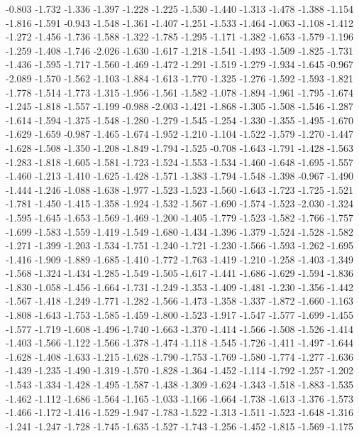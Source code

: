 \documentclass[9pt]{article}
\theoremstyle{plain}
\theoremstyle{definition}
\theoremstyle{remark}
\numberwithin{equation}{section}
\begin{document}
-0.803
-1.732
-1.336
-1.397
-1.228
-1.225
-1.530
-1.440
-1.313
-1.478
-1.388
-1.154
-1.816
-1.591
-0.943
-1.548
-1.361
-1.407
-1.251
-1.533
-1.464
-1.063
-1.108
-1.412
-1.272
-1.456
-1.736
-1.588
-1.322
-1.785
-1.295
-1.171
-1.382
-1.653
-1.579
-1.196
-1.259
-1.408
-1.746
-2.026
-1.630
-1.617
-1.218
-1.541
-1.493
-1.509
-1.825
-1.731
-1.436
-1.595
-1.717
-1.560
-1.469
-1.472
-1.291
-1.519
-1.279
-1.934
-1.645
-0.967
-2.089
-1.570
-1.562
-1.103
-1.884
-1.613
-1.770
-1.325
-1.276
-1.592
-1.593
-1.821
-1.778
-1.514
-1.773
-1.315
-1.956
-1.561
-1.582
-1.078
-1.894
-1.961
-1.795
-1.674
-1.245
-1.818
-1.557
-1.199
-0.988
-2.003
-1.421
-1.868
-1.305
-1.508
-1.546
-1.287
-1.614
-1.594
-1.375
-1.548
-1.280
-1.279
-1.545
-1.254
-1.330
-1.355
-1.495
-1.670
-1.629
-1.659
-0.987
-1.465
-1.674
-1.952
-1.210
-1.104
-1.522
-1.579
-1.270
-1.447
-1.628
-1.508
-1.350
-1.208
-1.849
-1.794
-1.525
-0.708
-1.643
-1.791
-1.428
-1.563
-1.283
-1.818
-1.605
-1.581
-1.723
-1.524
-1.553
-1.534
-1.460
-1.648
-1.695
-1.557
-1.460
-1.213
-1.410
-1.625
-1.428
-1.571
-1.383
-1.794
-1.548
-1.398
-0.967
-1.490
-1.444
-1.246
-1.088
-1.638
-1.977
-1.523
-1.523
-1.560
-1.643
-1.723
-1.725
-1.521
-1.781
-1.450
-1.415
-1.358
-1.924
-1.532
-1.567
-1.690
-1.574
-1.523
-2.030
-1.324
-1.595
-1.645
-1.653
-1.569
-1.469
-1.200
-1.405
-1.779
-1.523
-1.582
-1.766
-1.757
-1.699
-1.583
-1.559
-1.419
-1.549
-1.680
-1.434
-1.396
-1.379
-1.524
-1.528
-1.582
-1.271
-1.399
-1.203
-1.534
-1.751
-1.240
-1.721
-1.230
-1.566
-1.593
-1.262
-1.695
-1.416
-1.909
-1.889
-1.685
-1.410
-1.772
-1.763
-1.419
-1.210
-1.258
-1.403
-1.349
-1.568
-1.324
-1.434
-1.285
-1.549
-1.505
-1.617
-1.441
-1.686
-1.629
-1.594
-1.836
-1.830
-1.058
-1.456
-1.664
-1.731
-1.249
-1.353
-1.409
-1.481
-1.230
-1.356
-1.442
-1.567
-1.418
-1.249
-1.771
-1.282
-1.566
-1.473
-1.358
-1.337
-1.872
-1.660
-1.163
-1.808
-1.643
-1.753
-1.585
-1.459
-1.800
-1.523
-1.917
-1.547
-1.577
-1.699
-1.455
-1.577
-1.719
-1.608
-1.496
-1.740
-1.663
-1.370
-1.414
-1.566
-1.508
-1.526
-1.414
-1.403
-1.566
-1.122
-1.566
-1.378
-1.474
-1.118
-1.545
-1.726
-1.411
-1.497
-1.644
-1.628
-1.408
-1.633
-1.215
-1.628
-1.790
-1.753
-1.769
-1.580
-1.774
-1.277
-1.636
-1.439
-1.235
-1.490
-1.319
-1.570
-1.828
-1.364
-1.452
-1.114
-1.792
-1.257
-1.202
-1.543
-1.334
-1.428
-1.495
-1.587
-1.438
-1.309
-1.624
-1.343
-1.518
-1.883
-1.535
-1.462
-1.112
-1.686
-1.564
-1.165
-1.033
-1.166
-1.664
-1.738
-1.613
-1.376
-1.573
-1.466
-1.172
-1.416
-1.529
-1.947
-1.783
-1.522
-1.313
-1.511
-1.523
-1.648
-1.316
-1.241
-1.247
-1.728
-1.745
-1.635
-1.527
-1.743
-1.256
-1.452
-1.815
-1.569
-1.175
\end{document}
